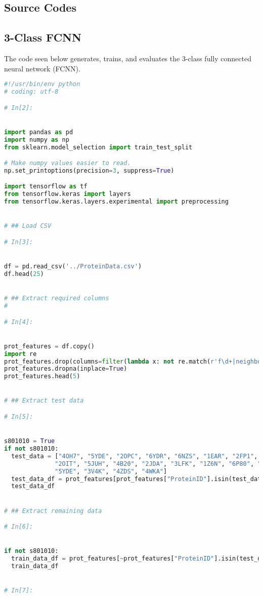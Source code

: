 \documentclass[12pt,letterpaper,oneside,reqno]{book}
\theoremstyle{plain}
\theoremstyle{definition}
\theoremstyle{plain}
\theoremstyle{remark}
\theoremstyle{plain}
\theoremstyle{definition}
\theoremstyle{plain}
\begin{document}
\begin{appendices}
\chapter{Source Codes}

\section{3-Class FCNN}
The code seen below generates, trains, and evaluates the 3-class fully connected neural network (FCNN).
\begin{lstlisting}[language=Python, label=lst:3classfcnnfull, frame=single]
#!/usr/bin/env python
# coding: utf-8

# In[2]:


import pandas as pd
import numpy as np
from sklearn.model_selection import train_test_split

# Make numpy values easier to read.
np.set_printoptions(precision=3, suppress=True)

import tensorflow as tf
from tensorflow.keras import layers
from tensorflow.keras.layers.experimental import preprocessing


# ## Load CSV

# In[3]:


df = pd.read_csv('../ProteinData.csv')
df.head(25)


# ## Extract required columns
# 

# In[4]:


prot_features = df.copy()
import re
prot_features.drop(columns=filter(lambda x: not re.match(r'f\d+|neighbors|ProteinID|SStype', x) ,prot_features.columns), inplace=True)
prot_features.dropna(inplace=True)
prot_features.head(5)


# ## Extract test data

# In[5]:


s801010 = True
if not s801010:
  test_data = ["4OH7", "5YDE", "2OPC", "6YDR", "6NZS", "1EAR", "2FP1", "2Z6R",
              "2OIT", "5JUH", "4B20", "2JDA", "3LFK", "1Z6N", "6P80", "5UEB",
              "5YDE", "3V4K", "4ZDS", "4WKA"]
  test_data_df = prot_features[prot_features["ProteinID"].isin(test_data)]
  test_data_df


# ## Extract remaining data

# In[6]:


if not s801010:
  train_data_df = prot_features[~prot_features["ProteinID"].isin(test_data)]
  train_data_df


# In[7]:



\end{lstlisting}
\end{appendices}
\end{document}
